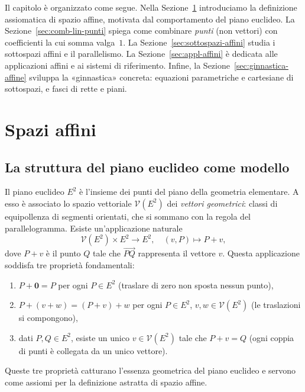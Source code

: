 \documentclass[11pt, a4paper]{book}
\theoremstyle{definition}
\theoremstyle{plain}
\theoremstyle{remark}
\newcommand{\VV}{\mathcal{V}}   %
\begin{document}
Il capitolo è organizzato come segue. Nella Sezione~\ref{sec:spazi-affini} introduciamo la definizione assiomatica di spazio affine, motivata dal comportamento del piano euclideo. La Sezione~\ref{sec:comb-lin-punti} spiega come combinare \emph{punti} (non vettori) con coefficienti la cui somma valga~$1$. La Sezione~\ref{sec:sottospazi-affini} studia i sottospazi affini e il parallelismo. La Sezione~\ref{sec:appl-affini} è dedicata alle applicazioni affini e ai sistemi di riferimento. Infine, la Sezione~\ref{sec:ginnastica-affine} sviluppa la «ginnastica» concreta: equazioni parametriche e cartesiane di sottospazi, e fasci di rette e piani.

\section{Spazi affini}
\label{sec:spazi-affini}

\subsection{La struttura del piano euclideo come modello}

Il piano euclideo $E^2$ è l'insieme dei punti del piano della geometria elementare. A esso è associato lo spazio vettoriale $\VV(E^2)$ dei \emph{vettori geometrici}: classi di equipollenza di segmenti orientati, che si sommano con la regola del parallelogramma. Esiste un'applicazione naturale
\[
  \VV(E^2) \times E^2 \longrightarrow E^2, \quad (v, P) \longmapsto P + v,
\]
dove $P + v$ è il punto $Q$ tale che $\overrightarrow{PQ}$ rappresenta il vettore $v$. Questa applicazione soddisfa tre proprietà fondamentali:
\begin{enumerate}
  \item $P + \mathbf{0} = P$ per ogni $P \in E^2$ (traslare di zero non sposta nessun punto),
  \item $P + (v + w) = (P + v) + w$ per ogni $P \in E^2$, $v, w \in \VV(E^2)$ (le traslazioni si compongono),
  \item dati $P, Q \in E^2$, esiste un unico $v \in \VV(E^2)$ tale che $P + v = Q$ (ogni coppia di punti è collegata da un unico vettore).
\end{enumerate}
Queste tre proprietà catturano l'essenza geometrica del piano euclideo e servono come assiomi per la definizione astratta di spazio affine.
\end{document}

